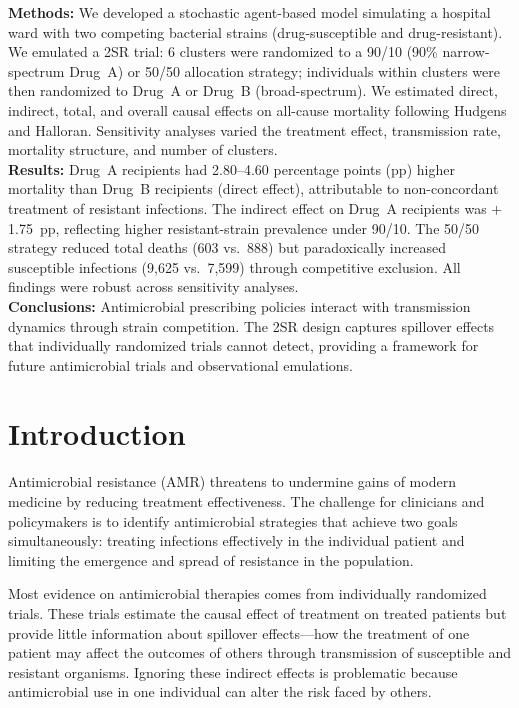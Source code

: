 \documentclass[12pt]{article}
\begin{document}
\noindent\textbf{Methods:} We developed a stochastic agent-based model simulating a hospital ward with two competing bacterial strains (drug-susceptible and drug-resistant). We emulated a 2SR trial: 6 clusters were randomized to a 90/10 (90\% narrow-spectrum Drug~A) or 50/50 allocation strategy; individuals within clusters were then randomized to Drug~A or Drug~B (broad-spectrum). We estimated direct, indirect, total, and overall causal effects on all-cause mortality following Hudgens and Halloran. Sensitivity analyses varied the treatment effect, transmission rate, mortality structure, and number of clusters.\\[0.3em]

\noindent\textbf{Results:} Drug~A recipients had 2.80--4.60 percentage points (pp) higher mortality than Drug~B recipients (direct effect), attributable to non-concordant treatment of resistant infections. The indirect effect on Drug~A recipients was $+$1.75~pp, reflecting higher resistant-strain prevalence under 90/10. The 50/50 strategy reduced total deaths (603 vs.\ 888) but paradoxically increased susceptible infections (9,625 vs.\ 7,599) through competitive exclusion. All findings were robust across sensitivity analyses.\\[0.3em]

\noindent\textbf{Conclusions:} Antimicrobial prescribing policies interact with transmission dynamics through strain competition. The 2SR design captures spillover effects that individually randomized trials cannot detect, providing a framework for future antimicrobial trials and observational emulations.\\[1em]

\clearpage
\doublespacing

\section*{Introduction}

Antimicrobial resistance (AMR) threatens to undermine gains of modern medicine by reducing treatment effectiveness.\cite{lipsitch_epidemiology_2000} The challenge for clinicians and policymakers is to identify antimicrobial strategies that achieve two goals simultaneously: treating infections effectively in the individual patient and limiting the emergence and spread of resistance in the population.

Most evidence on antimicrobial therapies comes from individually randomized trials. These trials estimate the causal effect of treatment on treated patients but provide little information about spillover effects---how the treatment of one patient may affect the outcomes of others through transmission of susceptible and resistant organisms. Ignoring these indirect effects is problematic because antimicrobial use in one individual can alter the risk faced by others.\cite{gago_how_2025}
\end{document}
